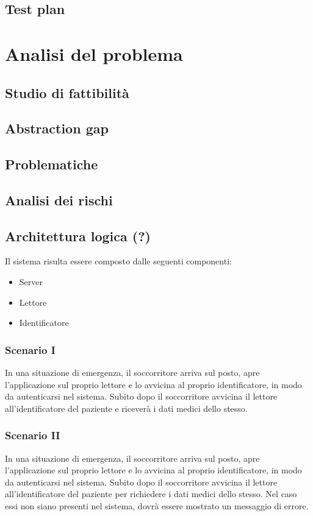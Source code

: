 \documentclass[a4paper,12pt]{report}
\begin{document}
\section{Test plan}

\chapter{Analisi del problema}

\section{Studio di fattibilità}

\section{Abstraction gap}

\section{Problematiche}

\section{Analisi dei rischi}

\section{Architettura logica (?)}
Il sistema risulta essere composto dalle seguenti componenti:
\begin{itemize}
	\item Server
	\item Lettore
	\item Identificatore
\end{itemize}

\subsection{Scenario I}
In una situazione di emergenza, il soccorritore arriva sul posto, apre l'applicazione sul proprio lettore e lo avvicina al proprio identificatore, in modo da autenticarsi nel sistema. Subito dopo il soccorritore avvicina il lettore all'identificatore del paziente e riceverà i dati medici dello stesso. 
\subsection{Scenario II}
In una situazione di emergenza, il soccorritore arriva sul posto, apre l'applicazione sul proprio lettore e lo avvicina al proprio identificatore, in modo da autenticarsi nel sistema. Subito dopo il soccorritore avvicina il lettore all'identificatore del paziente per richiedere i dati medici dello stesso. Nel caso essi non siano presenti nel sistema, dovrà essere mostrato un messaggio di errore.
\end{document}
